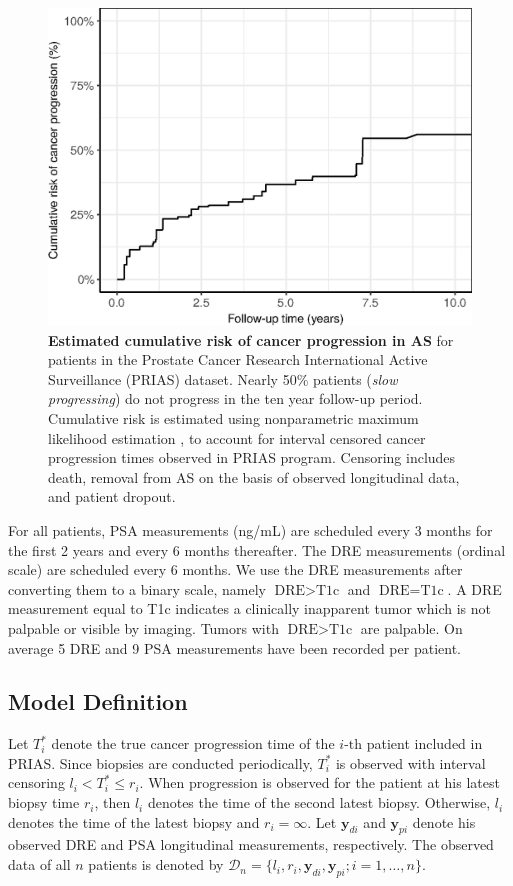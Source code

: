 \begin{figure}[!htb]
\captionsetup{justification=justified}
\centerline{\includegraphics[width=\columnwidth]{images/npmle_plot.eps}}
\caption{\textbf{Estimated cumulative risk of cancer progression in AS} for patients in the Prostate Cancer Research International Active Surveillance (PRIAS) dataset. Nearly 50\% patients (\textit{slow progressing}) do not progress in the ten year follow-up period. Cumulative risk is estimated using nonparametric maximum likelihood estimation \citep{turnbull1976empirical}, to account for interval censored cancer progression times observed in PRIAS program. Censoring includes death, removal from AS on the basis of observed longitudinal data, and patient dropout.}
\label{fig:npmle_plot}
\end{figure}

For all patients, PSA measurements (ng/mL) are scheduled every 3 months for the first 2 years and every 6 months thereafter. The DRE measurements (ordinal scale) are scheduled every 6 months. We use the DRE measurements after converting them to a binary scale, namely $\mbox{DRE} > \mbox{T1c}$ and $\mbox{DRE} = \mbox{T1c}$. A DRE measurement equal to T1c \citep{schroder1992tnm} indicates a clinically inapparent tumor which is not palpable or visible by imaging. Tumors with $\mbox{DRE} > \mbox{T1c}$ are palpable. On average 5 DRE and 9 PSA measurements have been recorded per patient. 

\subsection{Model Definition}
\label{subsec:model_def}
Let $T_i^*$ denote the true cancer progression time of the ${i\mbox{-th}}$ patient included in PRIAS. Since biopsies are conducted periodically, $T_i^*$ is observed with interval censoring ${l_i < T_i^* \leq r_i}$. When progression is observed for the patient at his latest biopsy time $r_i$, then $l_i$ denotes the time of the second latest biopsy. Otherwise, $l_i$ denotes the time of the latest biopsy and ${r_i=\infty}$. Let $\boldsymbol{y}_{di}$ and $\boldsymbol{y}_{pi}$ denote his observed DRE and PSA longitudinal measurements, respectively. The observed data of all $n$ patients is denoted by ${\mathcal{D}_n = \{l_i, r_i, \boldsymbol{y}_{di}, \boldsymbol{y}_{pi}; i = 1, \ldots, n\}}$.

